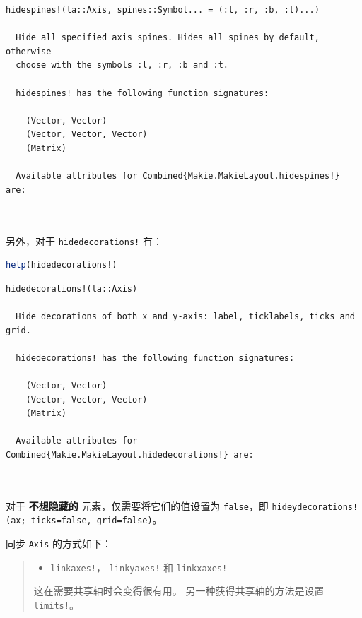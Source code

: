 \documentclass[
  notoc %
]{tufte-book}
\providecommand{\tightlist}{%
  \setlength{\itemsep}{0pt}\setlength{\parskip}{0pt}
}
\newcommand{\passthrough}[1]{#1}
\begin{document}
\begin{lstlisting}[language=Output]
  hidespines!(la::Axis, spines::Symbol... = (:l, :r, :b, :t)...)

  Hide all specified axis spines. Hides all spines by default, otherwise
  choose with the symbols :l, :r, :b and :t.

  hidespines! has the following function signatures:

    (Vector, Vector)
    (Vector, Vector, Vector)
    (Matrix)

  Available attributes for Combined{Makie.MakieLayout.hidespines!} are:

  
\end{lstlisting}

另外，对于 \passthrough{\lstinline"hidedecorations!"} 有：

\begin{lstlisting}[language=Julia]
help(hidedecorations!)
\end{lstlisting}

\begin{lstlisting}[language=Output]
  hidedecorations!(la::Axis)

  Hide decorations of both x and y-axis: label, ticklabels, ticks and grid.

  hidedecorations! has the following function signatures:

    (Vector, Vector)
    (Vector, Vector, Vector)
    (Matrix)

  Available attributes for Combined{Makie.MakieLayout.hidedecorations!} are:

  
\end{lstlisting}

对于 \textbf{不想隐藏的} 元素，仅需要将它们的值设置为
\passthrough{\lstinline!false!}，即
\passthrough{\lstinline"hideydecorations!(ax; ticks=false, grid=false)"}。

同步 \passthrough{\lstinline!Axis!} 的方式如下：

\begin{quote}
\begin{itemize}
\tightlist
\item
  \passthrough{\lstinline"linkaxes!"}，
  \passthrough{\lstinline"linkyaxes!"} 和
  \passthrough{\lstinline"linkxaxes!"}
\end{itemize}

这在需要共享轴时会变得很有用。 另一种获得共享轴的方法是设置
\passthrough{\lstinline"limits!"}。
\end{quote}
\end{document}
